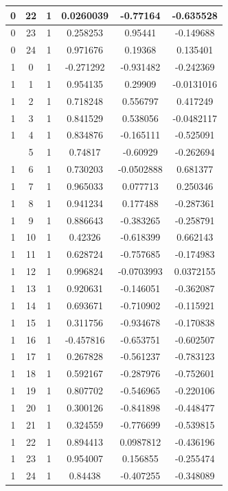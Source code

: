 \documentclass[12pt,a4paper]{article}
\numberwithin{equation}{section}
\numberwithin{figure}{section}
\numberwithin{table}{section}
\begin{document}
\begin{longtable}{|c|c|c|c|c|c|}
0 & 22 & 1 & 0.0260039 & -0.77164 & -0.635528 \\ \hline
0 & 23 & 1 & 0.258253 & 0.95441 & -0.149688 \\ \hline
0 & 24 & 1 & 0.971676 & 0.19368 & 0.135401 \\ \hline
1 & 0 & 1 & -0.271292 & -0.931482 & -0.242369 \\ \hline
1 & 1 & 1 & 0.954135 & 0.29909 & -0.0131016 \\ \hline
1 & 2 & 1 & 0.718248 & 0.556797 & 0.417249 \\ \hline
1 & 3 & 1 & 0.841529 & 0.538056 & -0.0482117 \\ \hline
1 & 4 & 1 & 0.834876 & -0.165111 & -0.525091 \\ \hline
\pagebreak
1 & 5 & 1 & 0.74817 & -0.60929 & -0.262694 \\ \hline
1 & 6 & 1 & 0.730203 & -0.0502888 & 0.681377 \\ \hline
1 & 7 & 1 & 0.965033 & 0.077713 & 0.250346 \\ \hline
1 & 8 & 1 & 0.941234 & 0.177488 & -0.287361 \\ \hline
1 & 9 & 1 & 0.886643 & -0.383265 & -0.258791 \\ \hline
1 & 10 & 1 & 0.42326 & -0.618399 & 0.662143 \\ \hline
1 & 11 & 1 & 0.628724 & -0.757685 & -0.174983 \\ \hline
1 & 12 & 1 & 0.996824 & -0.0703993 & 0.0372155 \\ \hline
1 & 13 & 1 & 0.920631 & -0.146051 & -0.362087 \\ \hline
1 & 14 & 1 & 0.693671 & -0.710902 & -0.115921 \\ \hline
1 & 15 & 1 & 0.311756 & -0.934678 & -0.170838 \\ \hline
1 & 16 & 1 & -0.457816 & -0.653751 & -0.602507 \\ \hline
1 & 17 & 1 & 0.267828 & -0.561237 & -0.783123 \\ \hline
1 & 18 & 1 & 0.592167 & -0.287976 & -0.752601 \\ \hline
1 & 19 & 1 & 0.807702 & -0.546965 & -0.220106 \\ \hline
1 & 20 & 1 & 0.300126 & -0.841898 & -0.448477 \\ \hline
1 & 21 & 1 & 0.324559 & -0.776699 & -0.539815 \\ \hline
1 & 22 & 1 & 0.894413 & 0.0987812 & -0.436196 \\ \hline
1 & 23 & 1 & 0.954007 & 0.156855 & -0.255474 \\ \hline
1 & 24 & 1 & 0.84438 & -0.407255 & -0.348089 \\ \hline

\end{longtable}
\end{document}
